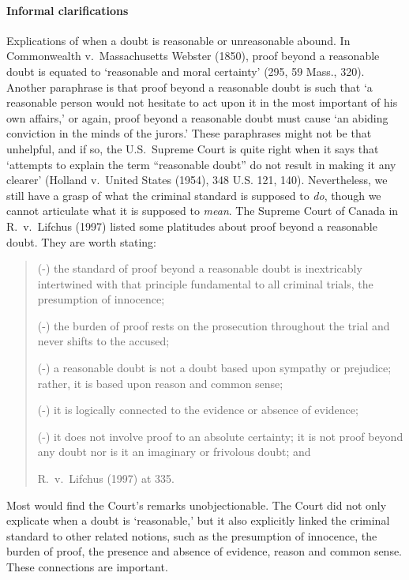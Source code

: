 \documentclass[10pt]{article}
\begin{document}
  \paragraph{Informal clarifications}
  Explications of when a doubt is reasonable 
or unreasonable abound. In Commonwealth v.\ Massachusetts Webster (1850), 
proof beyond a reasonable doubt is equated to `reasonable and moral certainty' (295, 59 Mass., 320).  Another paraphrase is that proof beyond a reasonable doubt is such that `a reasonable person would not hesitate to act upon it in the most important of his own affairs,' 
or again, proof beyond a reasonable doubt must cause `an abiding conviction in the minds of the jurors.' These paraphrases might not be that unhelpful, and if so, the U.S.\ Supreme Court is quite right when it says that `attempts to explain the term ``reasonable doubt'' do not result in making it any clearer' (Holland v.\ United States (1954), 348 U.S. 121, 140). Nevertheless, we still have a grasp of what the criminal standard 
is supposed to \textit{do}, though we cannot articulate what it is supposed to \textit{mean}. 
The Supreme Court of Canada in R.\ v.\ Lifchus (1997) listed some platitudes 
about proof beyond a reasonable doubt. They are worth stating:

\begin{quote}
(-) the standard of proof beyond a reasonable 
doubt is inextricably intertwined with that  
principle fundamental to all criminal trials, 
the presumption of innocence;


(-) the burden of proof rests on the prosecution 
throughout the trial and never shifts to the
accused; 

(-) a reasonable doubt is not a doubt based upon 
sympathy or prejudice; 
rather, it is based upon reason and common sense;

(-) it is logically connected to the evidence or  
absence of evidence; 
 
(-) it does not involve proof to an absolute certainty; it is not proof beyond any doubt nor is 
it an imaginary or frivolous doubt;  and

R.\ v.\ Lifchus (1997) at 335.
\end{quote}

\noindent
Most would find the Court's remarks unobjectionable.
The  Court did not only explicate when a doubt is `reasonable,' 
but it also explicitly linked the criminal standard to other related notions, 
such as the presumption of innocence, the burden of proof, the presence and absence of evidence, 
reason and common sense. These connections are important.
\end{document}
